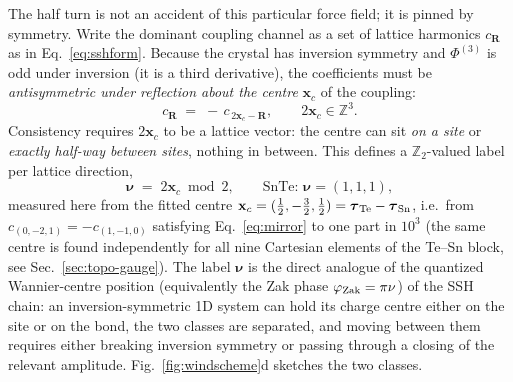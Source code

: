 \documentclass[11pt,a4paper]{article}
\begin{document}
The half turn is not an accident of this particular force field; it is
pinned by symmetry.  Write the dominant coupling channel as a set of
lattice harmonics $c_{\mathbf R}$ as in Eq.~\eqref{eq:sshform}.
Because the crystal has inversion symmetry and $\Phi^{(3)}$ is odd
under inversion (it is a third derivative), the coefficients must be
\emph{antisymmetric under reflection about the centre} $\mathbf x_c$ of
the coupling:
\begin{equation}
  c_{\mathbf R} \;=\; -\,c_{\,2\mathbf x_c-\mathbf R},
  \qquad 2\mathbf x_c \in \mathbb{Z}^3 .
  \label{eq:mirror}
\end{equation}
Consistency requires $2\mathbf x_c$ to be a lattice vector: the centre
can sit \emph{on a site} or \emph{exactly half-way between sites},
nothing in between.  This defines a $\mathbb{Z}_2$-valued label per
lattice direction,
\begin{equation}
  \boldsymbol\nu \;=\; 2\mathbf x_c \bmod 2 ,
  \qquad
  \text{SnTe: } \boldsymbol\nu = (1,1,1),
  \label{eq:nu}
\end{equation}
measured here from the fitted centre $\mathbf x_c =
(\tfrac12,-\tfrac32,\tfrac12) =
\boldsymbol\tau_{\rm Te}-\boldsymbol\tau_{\rm Sn}$, i.e.\ from
$c_{(0,-2,1)}=-c_{(1,-1,0)}$ satisfying Eq.~\eqref{eq:mirror} to one
part in $10^{3}$ (the same centre is found independently for all nine
Cartesian elements of the Te--Sn block, see
Sec.~\ref{sec:topo-gauge}).  The label $\boldsymbol\nu$ is the direct analogue of
the quantized Wannier-centre position (equivalently the Zak phase
$\varphi_{\rm Zak}=\pi\nu$) of the SSH chain: an inversion-symmetric
1D system can hold its charge centre either on the site or on the bond,
the two classes are separated, and moving between them requires either
breaking inversion symmetry or passing through a closing of the
relevant amplitude.  Fig.~\ref{fig:windscheme}d sketches the two
classes.
\end{document}
